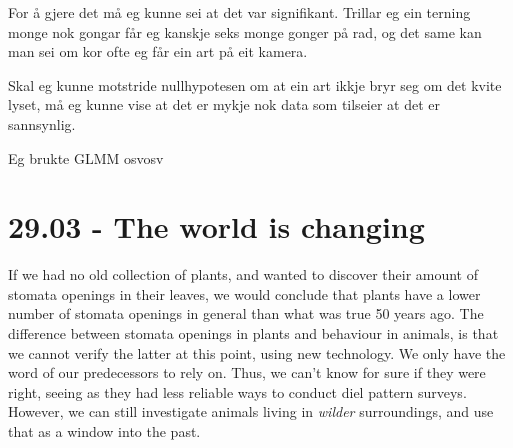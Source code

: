 For å gjere det må eg kunne sei at det var signifikant. Trillar eg ein terning monge nok gongar får eg kanskje seks monge gonger på rad, og det same kan man sei om kor ofte eg får ein art på eit kamera.

Skal eg kunne motstride nullhypotesen om at ein art ikkje bryr seg om det kvite lyset, må eg kunne vise at det er mykje nok data som tilseier at det er sannsynlig.


Eg brukte GLMM osvosv



\section{29.03 - The world is changing}
If we had no old collection of plants, and wanted to discover their amount of stomata openings in their leaves, we would conclude that plants have a lower number of stomata openings in general than what was true 50 years ago.
The difference between stomata openings in plants and behaviour in animals, is that we cannot verify the latter at this point, using new technology. We only have the word of our predecessors to rely on.
Thus, we can't know for sure if they were right, seeing as they had less reliable ways to conduct diel pattern surveys.
However, we can still investigate animals living in \textit{wilder} surroundings, and use that as a window into the past.





